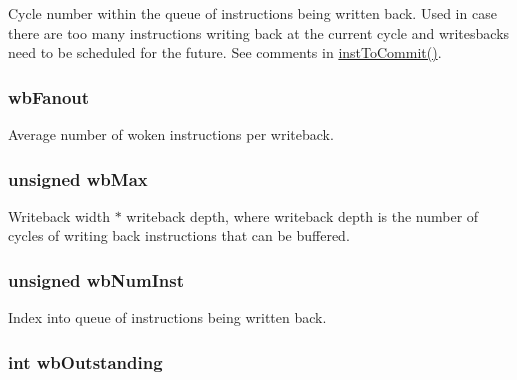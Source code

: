 \label{classDefaultIEW_ad2c7b2687f864f2b7359eb393276996f}
Cycle number within the queue of instructions being written back. Used in case there are too many instructions writing back at the current cycle and writesbacks need to be scheduled for the future. See comments in \hyperlink{classDefaultIEW_a720e9865ffa6e84b756f5ec1d1a24d94}{instToCommit()}. \hypertarget{classDefaultIEW_a667246d811337454bc9ceccf8bbf8f1c}{
\subsubsection[{wbFanout}]{ {\bf wbFanout}}}
\label{classDefaultIEW_a667246d811337454bc9ceccf8bbf8f1c}
Average number of woken instructions per writeback. \hypertarget{classDefaultIEW_a4feeca4f9ab71ed25ed257f08a09fe0e}{
\subsubsection[{wbMax}]{\setlength{\rightskip}{0pt plus 5cm}unsigned {\bf wbMax}}}
\label{classDefaultIEW_a4feeca4f9ab71ed25ed257f08a09fe0e}
Writeback width $\ast$ writeback depth, where writeback depth is the number of cycles of writing back instructions that can be buffered. \hypertarget{classDefaultIEW_a5fa0799bf5569437190dd1eda1d62b7b}{
\subsubsection[{wbNumInst}]{\setlength{\rightskip}{0pt plus 5cm}unsigned {\bf wbNumInst}}}
\label{classDefaultIEW_a5fa0799bf5569437190dd1eda1d62b7b}
Index into queue of instructions being written back. \hypertarget{classDefaultIEW_a225199c05fd7bddaf95d0d79171b31dc}{
\subsubsection[{wbOutstanding}]{\setlength{\rightskip}{0pt plus 5cm}int {\bf wbOutstanding}}}
